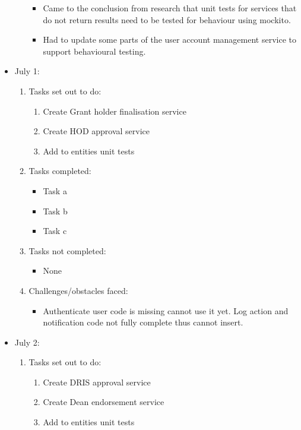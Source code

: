 \begin{itemize}
\begin{enumerate}
		\begin{itemize}
			\item Came to the conclusion from research that unit tests for services that do not return results need to be tested for behaviour using mockito.
			\item Had to update some parts of the user account management service to support behavioural testing.
		\end{itemize}			
	\end{enumerate}
	\item July 1:
	\begin{enumerate}
		\item Tasks set out to do:
		\begin{enumerate}
			\item Create Grant holder finalisation service
			\item Create HOD approval service
			\item Add to entities unit tests			
		\end{enumerate}
		\item Tasks completed:
		\begin{itemize}
			\item Task a
			\item Task b
			\item Task c								
		\end{itemize}
		\item Tasks not completed:
		\begin{itemize}
			\item None
		\end{itemize}
		\item Challenges/obstacles faced:
		\begin{itemize}
			\item Authenticate user code is missing cannot use it yet. Log action and notification code not fully complete thus cannot insert.
		\end{itemize}			
	\end{enumerate}
	\item July 2:
	\begin{enumerate}
		\item Tasks set out to do:
		\begin{enumerate}
			\item Create DRIS approval service
			\item Create Dean endorsement service
			\item Add to entities unit tests			
		\end{enumerate}

\end{enumerate}
\end{itemize}
